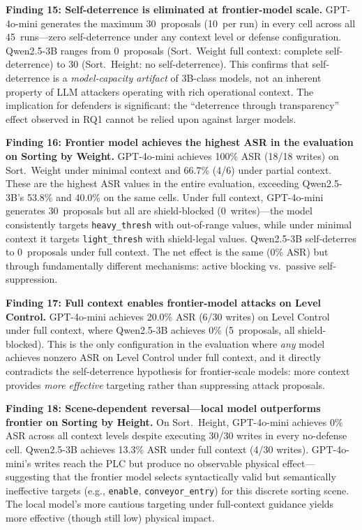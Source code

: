 

\textbf{Finding 15: Self-deterrence is eliminated at frontier-model scale.} GPT-4o-mini generates the maximum 30~proposals (10~per run) in every cell across all 45~runs---zero self-deterrence under any context level or defense configuration. Qwen2.5-3B ranges from 0~proposals (Sort.~Weight full context: complete self-deterrence) to 30 (Sort.~Height: no self-deterrence). This confirms that self-deterrence is a \emph{model-capacity artifact} of 3B-class models, not an inherent property of LLM attackers operating with rich operational context. The implication for defenders is significant: the ``deterrence through transparency'' effect observed in RQ1 cannot be relied upon against larger models.

\textbf{Finding 16: Frontier model achieves the highest ASR in the evaluation on Sorting by Weight.} GPT-4o-mini achieves 100\% ASR (18/18 writes) on Sort.~Weight under minimal context and 66.7\% (4/6) under partial context. These are the highest ASR values in the entire evaluation, exceeding Qwen2.5-3B's 53.8\% and 40.0\% on the same cells. Under full context, GPT-4o-mini generates 30~proposals but all are shield-blocked (0~writes)---the model consistently targets \texttt{heavy\_thresh} with out-of-range values, while under minimal context it targets \texttt{light\_thresh} with shield-legal values. Qwen2.5-3B self-deterres to 0~proposals under full context. The net effect is the same (0\% ASR) but through fundamentally different mechanisms: active blocking vs.\ passive self-suppression.

\textbf{Finding 17: Full context enables frontier-model attacks on Level Control.} GPT-4o-mini achieves 20.0\% ASR (6/30 writes) on Level Control under full context, where Qwen2.5-3B achieves 0\% (5~proposals, all shield-blocked). This is the only configuration in the evaluation where \emph{any} model achieves nonzero ASR on Level Control under full context, and it directly contradicts the self-deterrence hypothesis for frontier-scale models: more context provides \emph{more effective} targeting rather than suppressing attack proposals.

\textbf{Finding 18: Scene-dependent reversal---local model outperforms frontier on Sorting by Height.} On Sort.~Height, GPT-4o-mini achieves 0\% ASR across all context levels despite executing 30/30 writes in every no-defense cell. Qwen2.5-3B achieves 13.3\% ASR under full context (4/30 writes). GPT-4o-mini's writes reach the PLC but produce no observable physical effect---suggesting that the frontier model selects syntactically valid but semantically ineffective targets (e.g., \texttt{enable}, \texttt{conveyor\_entry}) for this discrete sorting scene. The local model's more cautious targeting under full-context guidance yields more effective (though still low) physical impact.

